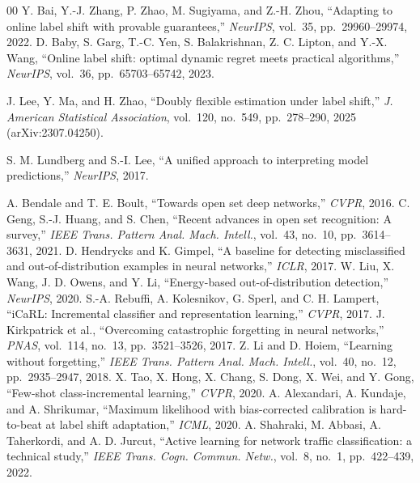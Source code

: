 \begin{thebibliography}{00}
 Y. Bai, Y.-J. Zhang, P. Zhao, M. Sugiyama, and Z.-H. Zhou, ``Adapting to online label shift with provable guarantees,'' \textit{NeurIPS}, vol.~35, pp.~29960--29974, 2022.
 D. Baby, S. Garg, T.-C. Yen, S. Balakrishnan, Z. C. Lipton, and Y.-X. Wang, ``Online label shift: optimal dynamic regret meets practical algorithms,'' \textit{NeurIPS}, vol.~36, pp.~65703--65742, 2023.

 J. Lee, Y. Ma, and H. Zhao, ``Doubly flexible estimation under label shift,'' \textit{J. American Statistical Association}, vol.~120, no.~549, pp.~278--290, 2025 (arXiv:2307.04250).

 S. M. Lundberg and S.-I. Lee, ``A unified approach to interpreting model predictions,'' \textit{NeurIPS}, 2017. %

 A. Bendale and T. E. Boult, ``Towards open set deep networks,'' \textit{CVPR}, 2016. %
 C. Geng, S.-J. Huang, and S. Chen, ``Recent advances in open set recognition: A survey,'' \textit{IEEE Trans. Pattern Anal. Mach. Intell.}, vol.~43, no.~10, pp.~3614--3631, 2021.
 D. Hendrycks and K. Gimpel, ``A baseline for detecting misclassified and out-of-distribution examples in neural networks,'' \textit{ICLR}, 2017.
 W. Liu, X. Wang, J. D. Owens, and Y. Li, ``Energy-based out-of-distribution detection,'' \textit{NeurIPS}, 2020.
 S.-A. Rebuffi, A. Kolesnikov, G. Sperl, and C. H. Lampert, ``iCaRL: Incremental classifier and representation learning,'' \textit{CVPR}, 2017. %
 J. Kirkpatrick et al., ``Overcoming catastrophic forgetting in neural networks,'' \textit{PNAS}, vol.~114, no.~13, pp.~3521--3526, 2017. %
 Z. Li and D. Hoiem, ``Learning without forgetting,'' \textit{IEEE Trans. Pattern Anal. Mach. Intell.}, vol.~40, no.~12, pp.~2935--2947, 2018.
 X. Tao, X. Hong, X. Chang, S. Dong, X. Wei, and Y. Gong, ``Few-shot class-incremental learning,'' \textit{CVPR}, 2020. %
 A. Alexandari, A. Kundaje, and A. Shrikumar, ``Maximum likelihood with bias-corrected calibration is hard-to-beat at label shift adaptation,'' \textit{ICML}, 2020.
 A. Shahraki, M. Abbasi, A. Taherkordi, and A. D. Jurcut, ``Active learning for network traffic classification: a technical study,'' \textit{IEEE Trans. Cogn. Commun. Netw.}, vol.~8, no.~1, pp.~422--439, 2022.

\end{thebibliography}

